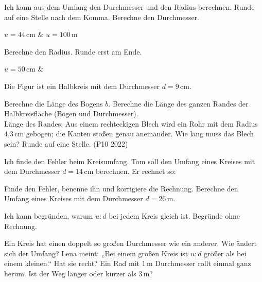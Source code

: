 \begin{aufgabe}{Ich kann aus dem Umfang den Durchmesser und den Radius berechnen. Runde auf eine Stelle nach dem Komma.}
Berechne den Durchmesser.
\begin{teilezwei}
\tz $u = 44$\,cm \quad {} & \tz $u = 100$\,m \quad {} \\
\end{teilezwei}
Berechne den Radius. Runde erst am Ende.
\begin{teilezwei}
\tz $u = 50$\,cm \quad {} & \\
\end{teilezwei}
Die Figur ist ein Halbkreis mit dem Durchmesser $d = 9$\,cm.

\begin{kreis}[1.3]\end{kreis}

\begin{teile}
\setcounter{teil}{3}
\teil Berechne die Länge des Bogens $b$. \quad {}
\teil Berechne die Länge des ganzen Randes der Halbkreisfläche (Bogen und Durchmesser). \\ Länge des Randes: \leerfeld[cm]
\teil Aus einem rechteckigen Blech wird ein Rohr mit dem Radius 4,3\,cm gebogen; die Kanten stoßen genau aneinander. Wie lang muss das Blech sein? Runde auf eine Stelle. (P10 2022)
\end{teile}
\end{aufgabe}

\begin{aufgabe}{Ich finde den Fehler beim Kreisumfang. Tom soll den Umfang eines Kreises mit dem Durchmesser $d = 14$\,cm berechnen. Er rechnet so:}
\begin{teile}
\teil Finde den Fehler, benenne ihn und korrigiere die Rechnung.
\teil Berechne den Umfang eines Kreises mit dem Durchmesser $d = 26$\,m.
\end{teile}
\end{aufgabe}

\begin{aufgabe}{Ich kann begründen, warum $u : d$ bei jedem Kreis gleich ist. Begründe ohne Rechnung.}
\begin{teile}
\teil Ein Kreis hat einen doppelt so großen Durchmesser wie ein anderer. Wie ändert sich der Umfang?
\teil Lena meint: „Bei einem großen Kreis ist $u : d$ größer als bei einem kleinen.“ Hat sie recht?
\teil Ein Rad mit 1\,m Durchmesser rollt einmal ganz herum. Ist der Weg länger oder kürzer als 3\,m?
\end{teile}
\end{aufgabe}


